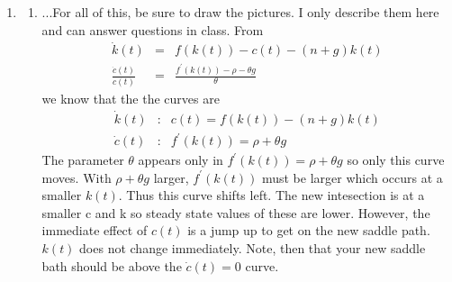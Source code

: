 \documentclass{article}
\begin{document}
\begin{enumerate}
\item 

\begin{enumerate}
\item ...For all of this, be sure to draw the pictures. I only describe them
here and can answer questions in class. From 
\begin{eqnarray*}
\dot{k}\left( t\right)  &=&f\left( k\left( t\right) \right) -c\left(
t\right) -\left( n+g\right) k\left( t\right)  \\
\frac{\dot{c}\left( t\right) }{c\left( t\right) } &=&\frac{f^{\prime }\left(
k\left( t\right) \right) -\rho -\theta g}{\theta }
\end{eqnarray*}%
we know that the the curves are  
\begin{eqnarray*}
\dot{k}\left( t\right)  &:&c\left( t\right) =f\left( k\left( t\right)
\right) -\left( n+g\right) k\left( t\right)  \\
\dot{c}\left( t\right)  &:&f^{\prime }\left( k\left( t\right) \right) =\rho
+\theta g
\end{eqnarray*}%
The parameter $\theta $ appears only in $f^{\prime }\left( k\left( t\right)
\right) =\rho +\theta g$ so only this curve moves. With $\rho +\theta g$
larger, $f^{\prime }\left( k\left( t\right) \right) $ must be larger which
occurs at a smaller $k\left( t\right) $. Thus this curve shifts left. The
new intesection is at a smaller c and k so steady state values of these are
lower. However, the immediate effect of $c\left( t\right) $ is a jump up to
get on the new saddle path. $k(t)$ does not change immediately. Note, then
that your new saddle bath should be above the $\dot{c}\left( t\right) =0$
curve. 


\end{enumerate}
\end{enumerate}
\end{document}
